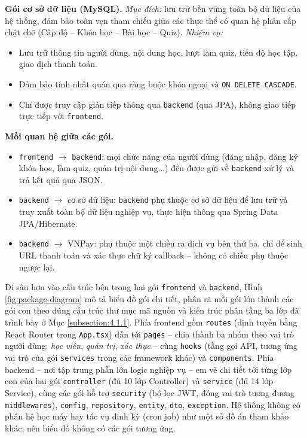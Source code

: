 \documentclass[../DoAn.tex]{subfiles}
\begin{document}
\textbf{Gói cơ sở dữ liệu (MySQL).} \textit{Mục đích:} lưu trữ bền vững toàn bộ dữ liệu của hệ thống, đảm bảo toàn vẹn tham chiếu giữa các thực thể có quan hệ phân cấp chặt chẽ (Cấp độ -- Khóa học -- Bài học -- Quiz). \textit{Nhiệm vụ:}
\begin{itemize}
    \item Lưu trữ thông tin người dùng, nội dung học, lượt làm quiz, tiến độ học tập, giao dịch thanh toán.
    \item Đảm bảo tính nhất quán qua ràng buộc khóa ngoại và \texttt{ON DELETE CASCADE}.
    \item Chỉ được truy cập gián tiếp thông qua \texttt{backend} (qua JPA), không giao tiếp trực tiếp với \texttt{frontend}.
\end{itemize}

\textbf{Mối quan hệ giữa các gói.}
\begin{itemize}
    \item \texttt{frontend} $\to$ \texttt{backend}: mọi chức năng của người dùng (đăng nhập, đăng ký khóa học, làm quiz, quản trị nội dung...) đều được gửi về \texttt{backend} xử lý và trả kết quả qua JSON.
    \item \texttt{backend} $\to$ cơ sở dữ liệu: \texttt{backend} phụ thuộc cơ sở dữ liệu để lưu trữ và truy xuất toàn bộ dữ liệu nghiệp vụ, thực hiện thông qua Spring Data JPA/Hibernate.
    \item \texttt{backend} $\to$ VNPay: phụ thuộc một chiều ra dịch vụ bên thứ ba, chỉ để sinh URL thanh toán và xác thực chữ ký callback -- không có chiều phụ thuộc ngược lại.
\end{itemize}

Đi sâu hơn vào cấu trúc bên trong hai gói \texttt{frontend} và \texttt{backend}, Hình \ref{fig:package-diagram} mô tả biểu đồ gói chi tiết, phân rã mỗi gói lớn thành các gói con theo đúng cấu trúc thư mục mã nguồn và kiến trúc phân tầng ba lớp đã trình bày ở Mục \ref{subsection:4.1.1}. Phía frontend gồm \texttt{routes} (định tuyến bằng React Router trong \texttt{App.tsx}) dẫn tới \texttt{pages} -- chia thành ba nhóm theo vai trò người dùng: \textit{học viên}, \textit{quản trị}, \textit{xác thực} -- cùng \texttt{hooks} (tầng gọi API, tương ứng vai trò của gói \texttt{services} trong các framework khác) và \texttt{components}. Phía backend -- nơi tập trung phần lớn logic nghiệp vụ -- em vẽ chi tiết tới từng lớp con của hai gói \texttt{controller} (đủ 10 lớp Controller) và \texttt{service} (đủ 14 lớp Service), cùng các gói hỗ trợ \texttt{security} (bộ lọc JWT, đóng vai trò tương đương \texttt{middlewares}), \texttt{config}, \texttt{repository}, \texttt{entity}, \texttt{dto}, \texttt{exception}. Hệ thống không có phân hệ học máy hay tác vụ định kỳ (cron job) như một số đồ án tham khảo khác, nên biểu đồ không có các gói tương ứng.
\end{document}
